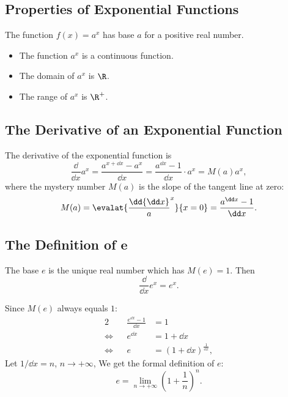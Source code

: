 \subsection{Properties of Exponential Functions}
The function $f(x)=a^x$ has base $a$ for a positive real number.
\begin{itemize}
\item The function $a^x$ is a continuous function.
\item The domain of $a^x$ is $\R$.
\item The range of $a^x$ is $\R^+$.
\end{itemize}

\subsection{The Derivative of an Exponential Function}
The derivative of the exponential function is
\[
\frac\dd{\dd x}a^x=\frac{a^{x+\dd x}-a^x}{\dd x}=\frac{a^{\dd x}-1}{\dd x}\cdot a^x=M(a)a^x,
\]
where the mystery number $M(a)$ is the slope of the tangent line at zero:
\[M(a)=\evalat{\frac\dd{\dd x}a^x}{x=0}=\frac{a^{\dd x}-1}{\dd x}.\]

\subsection{The Definition of $\bm e$}
The base $e$ is the unique real number which has $M(e)=1$. Then
\[\frac\dd{\dd x}e^x=e^x.\]

Since $M(e)$ always equals $1$:
\begin{alignat*}{2}
       && \frac{e^{\dd x} -1}{\dd x} & =1\\
  \iff &&                  e^{\dd x} & =1+\dd x\\
  \iff &&                          e & =(1+\dd x)^{\frac{1}{\dd x}},
\end{alignat*}
Let $1/\dd x=n$, $n\to+\infty$, We get the formal definition of $e$:
\[e=\lim_{n\to+\infty}(1+\frac{1}{n})^n.\]

